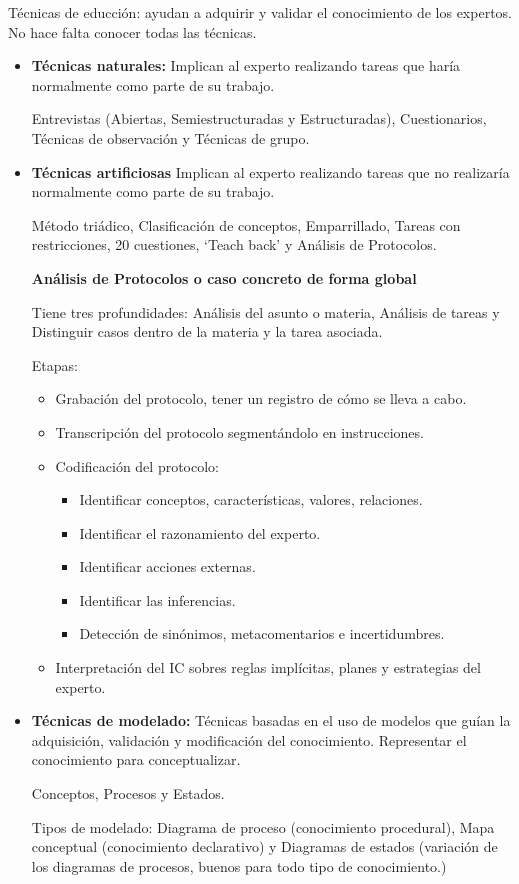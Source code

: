 \documentclass[12pt, twoside, openright]{report} %
\begin{document}
Técnicas de educción: ayudan a adquirir y validar el conocimiento de los expertos. No hace falta conocer todas las técnicas.
\begin{itemize}
	\item \textbf{Técnicas naturales:} Implican al experto realizando tareas que haría normalmente como parte de su trabajo.
	      
	      Entrevistas (Abiertas, Semiestructuradas y Estructuradas), Cuestionarios, Técnicas de observación y Técnicas de grupo.
	\item \textbf{Técnicas artificiosas} Implican al experto realizando tareas que no realizaría normalmente como parte de su trabajo.
	      
	      Método triádico, Clasificación de conceptos, Emparrillado, Tareas con restricciones, 20 cuestiones, ‘Teach back’ y Análisis de Protocolos.
	      
	      \textbf{Análisis de Protocolos o caso concreto de forma global}
	      
	      Tiene tres profundidades: Análisis del asunto o materia, Análisis de tareas y Distinguir casos dentro de la materia y la tarea asociada.
	      
	      Etapas:
	      \begin{itemize}
		      \item Grabación del protocolo, tener un registro de cómo se lleva a cabo.
		      \item Transcripción del protocolo segmentándolo en instrucciones.
		      \item Codificación del protocolo:
		            \begin{itemize}
			            \item Identificar conceptos, características, valores, relaciones.
			            \item Identificar el razonamiento del experto.
			            \item Identificar acciones externas.
			            \item Identificar las inferencias.
			            \item Detección de sinónimos, metacomentarios e incertidumbres.
		            \end{itemize}
		      \item Interpretación del IC sobres reglas implícitas, planes y estrategias del experto.
	      \end{itemize}
	      
	\item \textbf{Técnicas de modelado:} Técnicas basadas en el uso de modelos que guían la adquisición, validación y modificación del conocimiento. Representar el conocimiento para conceptualizar.
	      
	      Conceptos, Procesos y Estados.
	      
	      Tipos de modelado: Diagrama de proceso (conocimiento procedural), Mapa conceptual (conocimiento declarativo) y Diagramas de estados (variación de los diagramas de procesos, buenos para todo tipo de conocimiento.)
\end{itemize}
\end{document}
